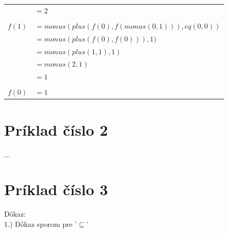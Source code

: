 \documentclass[11pt,a4paper]{article}
\begin{document}
\begin{tabular}{rl}
                    & $= 2$\\
\\[-0.5em]
$f(1)$\hspace{-3mm} & $= monus(plus(f(0),f(monus(0,1))),eq(0,0))$\\
                    & $= monus(plus(f(0),f(0))),1)$\\
                    & $= monus(plus(1,1),1)$\\
                    & $= monus(2,1)$\\
                    & $= 1$\\
\\[-0.5em]
$f(0)$\hspace{-3mm} & $= 1$\\
\end{tabular}

\newpage
\section{Príklad číslo 2}

...

\newpage
\section{Príklad číslo 3}

Dôkaz:\\[-0.5em]

\hspace{5mm}1.) Dôkaz sporom pre '$\subseteq$'
\end{document}
